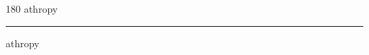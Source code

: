 
\begin{frame}
\begin{center}
\begin{turn}{180}
{\fontsize{2.5cm}{1em}\selectfont athropy}
\end{turn}
\vspace{1em}\par  
\hrule
\vspace{1em}\par  
{\fontsize{2.5cm}{1em}\selectfont athropy}
\end{center}
\end{frame}
